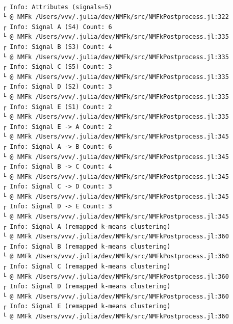 \documentclass[11pt]{article}
\begin{document}
    
    \begin{center}
    \end{center}
    { \hspace*{\fill} \\}
    
    \begin{Verbatim}[commandchars=\\\{\}]
┌ Info: Attributes (signals=5)
└ @ NMFk /Users/vvv/.julia/dev/NMFk/src/NMFkPostprocess.jl:322
┌ Info: Signal A (S4) Count: 6
└ @ NMFk /Users/vvv/.julia/dev/NMFk/src/NMFkPostprocess.jl:335
┌ Info: Signal B (S3) Count: 4
└ @ NMFk /Users/vvv/.julia/dev/NMFk/src/NMFkPostprocess.jl:335
┌ Info: Signal C (S5) Count: 3
└ @ NMFk /Users/vvv/.julia/dev/NMFk/src/NMFkPostprocess.jl:335
┌ Info: Signal D (S2) Count: 3
└ @ NMFk /Users/vvv/.julia/dev/NMFk/src/NMFkPostprocess.jl:335
┌ Info: Signal E (S1) Count: 2
└ @ NMFk /Users/vvv/.julia/dev/NMFk/src/NMFkPostprocess.jl:335
┌ Info: Signal E -> A Count: 2
└ @ NMFk /Users/vvv/.julia/dev/NMFk/src/NMFkPostprocess.jl:345
┌ Info: Signal A -> B Count: 6
└ @ NMFk /Users/vvv/.julia/dev/NMFk/src/NMFkPostprocess.jl:345
┌ Info: Signal B -> C Count: 4
└ @ NMFk /Users/vvv/.julia/dev/NMFk/src/NMFkPostprocess.jl:345
┌ Info: Signal C -> D Count: 3
└ @ NMFk /Users/vvv/.julia/dev/NMFk/src/NMFkPostprocess.jl:345
┌ Info: Signal D -> E Count: 3
└ @ NMFk /Users/vvv/.julia/dev/NMFk/src/NMFkPostprocess.jl:345
┌ Info: Signal A (remapped k-means clustering)
└ @ NMFk /Users/vvv/.julia/dev/NMFk/src/NMFkPostprocess.jl:360
┌ Info: Signal B (remapped k-means clustering)
└ @ NMFk /Users/vvv/.julia/dev/NMFk/src/NMFkPostprocess.jl:360
┌ Info: Signal C (remapped k-means clustering)
└ @ NMFk /Users/vvv/.julia/dev/NMFk/src/NMFkPostprocess.jl:360
┌ Info: Signal D (remapped k-means clustering)
└ @ NMFk /Users/vvv/.julia/dev/NMFk/src/NMFkPostprocess.jl:360
┌ Info: Signal E (remapped k-means clustering)
└ @ NMFk /Users/vvv/.julia/dev/NMFk/src/NMFkPostprocess.jl:360
    \end{Verbatim}

    \begin{center}
    \end{center}
    { \hspace*{\fill} \\}
    
    \begin{Verbatim}[commandchars=\\\{\}]

    \end{Verbatim}
\end{document}
